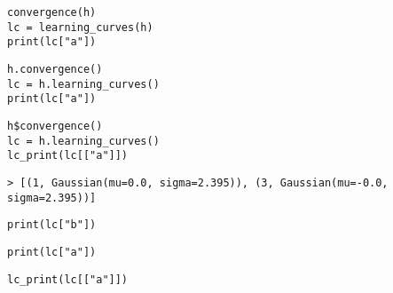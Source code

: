 \documentclass[article]{jss}
\newif\ifen
\newif\ifes
\newcommand{\en}[1]{\ifen#1\fi}
\newcommand{\es}[1]{\ifes#1\fi}
\begin{document}
%
\en{TrueSkill's inability to obtain correct estimates is fixed by the TrueSkill Through Time model, in which information propagates throughout the system.}
\es{La incapacidad de TrueSkill para obtener las estimaciones correctas se resuelve mediante el modelo TrueSkill Through Time, en el que la información propaga por todo el sistema.}
%
\en{Our package allows computing the correct estimates, those of the TrueSkill Through Time model, by calling the method \texttt{convergence()} of the class \texttt{History}.}
\es{Nuestro paquete permite computar las estimaciones correctas, las del modelo TrueSkill Through Time, llamando al método \texttt{convergence()} de la clase \texttt{History}.}
%
\begin{lstlisting}[backgroundcolor=\color{white},label=lst:ttt, caption={\en{Computing TrueSkill Through Time learning curves}\es{Propagación de la información en todo el sistema para calcular las curvas de aprendizaje de TrueSkill Through Time}}, belowskip=-1.0 \baselineskip, aboveskip=0.1cm]
\end{lstlisting}
\begin{paracol}{3}
\begin{lstlisting}[backgroundcolor=\color{julia}, belowskip=-0.77 \baselineskip]
convergence(h)
lc = learning_curves(h)
print(lc["a"])
\end{lstlisting}
  \switchcolumn
\begin{lstlisting}[backgroundcolor=\color{python}, belowskip=-0.77 \baselineskip]
h.convergence()
lc = h.learning_curves()
print(lc["a"])
\end{lstlisting}
   \switchcolumn
\begin{lstlisting}[backgroundcolor=\color{r}, belowskip=-0.77 \baselineskip]
h$convergence()
lc = h.learning_curves()
lc_print(lc[["a"]])
\end{lstlisting}
\end{paracol}
\begin{lstlisting}[backgroundcolor=\color{all}, belowskip=-0.77 \baselineskip]
> [(1, Gaussian(mu=0.0, sigma=2.395)), (3, Gaussian(mu=-0.0, sigma=2.395))]
\end{lstlisting}
\begin{paracol}{3}
\begin{lstlisting}[backgroundcolor=\color{julia}, belowskip=-0.77 \baselineskip]
print(lc["b"])
\end{lstlisting}
  \switchcolumn
\begin{lstlisting}[backgroundcolor=\color{python}, belowskip=-0.77 \baselineskip]
print(lc["a"])
\end{lstlisting}
   \switchcolumn
\begin{lstlisting}[backgroundcolor=\color{r}, belowskip=-0.77 \baselineskip]
lc_print(lc[["a"]])
\end{lstlisting}
\end{paracol}
\end{document}
